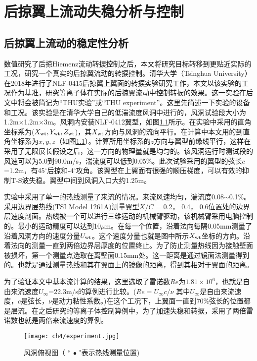 \chapter{后掠翼上流动失稳分析与控制}
\section{后掠翼上流动的稳定性分析}
数值研究了后掠Hiemenz流动转捩控制之后，本文将研究目标转移到更贴近实际的工况，研究一个真实的后掠翼流动的转捩控制。清华大学（Tsinghua University）在2018年进行了NLF-0415后掠翼上翼面的转捩实验研究工作\cite{wang2018}，本文以该实验的工况作为基准，研究等离子体在实际的后掠翼流动中控制转捩的效果。这一实验在后文中将会被简记为``THU实验''或``THU experiment''。这里先简述一下实验的设备和工况。该实验是在清华大学自己的低湍流度风洞中进行的，风洞试验段大小为1.2m$\times$1.2m$\times$3m。风洞内安装NLF-0412翼型，如图\ref{f:experiment}所示。在实验中采用的直角坐标系为($X_{\rm wt},Y_{\rm wt},Z_{\rm wt}$)，其$X_{\rm wt}$方向与风洞的流向平行。在计算中本文用的到直角坐标系为$x,y,z$（如图\ref{f:experiment}）。计算所用坐标系的$z$方向与翼型前缘线平行，这样在采用了无限展长假设之后，这一方向的物理量就是均匀的。该风洞运行时测试段的风速可以为5.0到90.0m/s，湍流度可以低到0.05\%。此次试验采用的翼型的弦长$c$=1.2m，有45$^\circ$后掠和-4$^\circ$攻角。该翼型在上翼面有很强的顺压梯度，可以有效的抑制T-S波失稳\cite{Dagenhart1999}。翼型中间到风洞入口大约1.25m。

实验中采用了单一的热线测量了来流的情况。来流风速均匀，湍流度0.08$\sim$0.1\%。采用边界层热线(TSI Model 1261A)测量翼型$X/C$ = 0.2， 0.4， 0.6位置处的边界层速度剖面。热线被一个可以进行三维运动的机械臂驱动，该机械臂采用电脑控制的。最小的运动精度可以达到10$\mu$m。在每一个位置，沿着法向每隔0.05mm测量了沿着风洞方向的速度分量$U_{\rm wt}$。这个速度分量也就是图中所示$X_{\rm wt}$坐标的方向。沿着法向的测量一直到两倍边界层厚度的位置终止。为了防止测量热线因为接触壁面被损坏，第一个测量点选取在离壁面0.15mm处。这一距离是通过镜面法测量得到的。也就是通过测量热线和其在翼面上的镜像的距离，得到其相对于翼面的距离。

为了验证本文中基本流计算的结果，这里选取了雷诺数$Re$为$1.81\times10^6$，也就是自由来流速度$U_\infty$=22.3m/s的算例进行比较。($Re={U_\infty c}/{\nu}$ 其中$U_\infty$是自由来流速度，$c$是弦长，$\nu$是动力粘性系数。)在这个工况下，上翼面一直到70\%弦长的位置都是层流。在之后研究的等离子体控制算例中，为了加速失稳和转捩，采用了两倍雷诺数也就是两倍来流速度的算例。

\begin{figure}
  \centering
  \texttt{[image: ch4/experiment.jpg]}
  \caption{风洞俯视图（ `` $\bullet$ "表示热线测量位置)}\label{f:experiment}
\end{figure}

